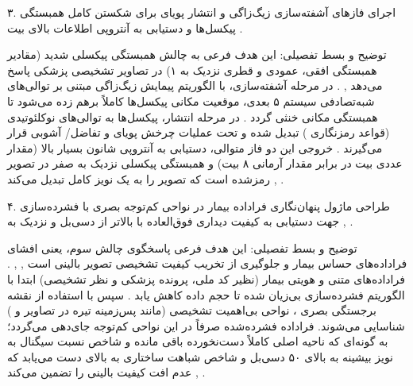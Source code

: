

۳. اجرای فازهای آشفته‌سازی زیگ‌زاگی  و انتشار پویای   برای شکستن کامل همبستگی پیکسل‌ها و دستیابی به آنتروپی اطلاعات بالای  بیت .\par

توضیح و بسط تفصیلی: این هدف فرعی به چالش همبستگی پیکسلی شدید (مقادیر همبستگی افقی، عمودی و قطری نزدیک به ۱) در تصاویر تشخیصی پزشکی پاسخ می‌دهد , . در مرحله آشفته‌سازی، با الگوریتم پیمایش زیگ‌زاگی مبتنی بر توالی‌های شبه‌تصادفی سیستم ۵ بعدی، موقعیت مکانی پیکسل‌ها کاملاً برهم زده می‌شود تا همبستگی مکانی خنثی گردد . در مرحله انتشار، پیکسل‌ها به توالی‌های نوکلئوتیدی  (قواعد رمزنگاری ) تبدیل شده و تحت عملیات چرخش پویای   و تفاضل/ آشوبی قرار می‌گیرند . خروجی این دو فاز متوالی، دستیابی به آنتروپی شانون بسیار بالا (مقدار عددی  بیت در برابر مقدار آرمانی ۸ بیت) و همبستگی پیکسلی نزدیک به صفر در تصویر رمزشده است که تصویر را به یک نویز کامل تبدیل می‌کند , .\par



۴. طراحی ماژول پنهان‌نگاری فراداده بیمار در نواحی کم‌توجه بصری  با فشرده‌سازی  جهت دستیابی به کیفیت دیداری فوق‌العاده با  بالاتر از  دسی‌بل و  نزدیک به  , .\par

توضیح و بسط تفصیلی: این هدف فرعی پاسخگوی چالش سوم، یعنی افشای فراداده‌های حساس بیمار و جلوگیری از تخریب کیفیت تشخیصی تصویر بالینی است , , . فراداده‌های متنی و هویتی بیمار (نظیر کد ملی، پرونده پزشکی و نظر تشخیصی) ابتدا با الگوریتم  فشرده‌سازی بی‌زیان شده تا حجم داده کاهش یابد . سپس با استفاده از نقشه برجستگی بصری ، نواحی بی‌اهمیت تشخیصی (مانند پس‌زمینه تیره در تصاویر  و ) شناسایی می‌شوند. فراداده فشرده‌شده صرفاً در این نواحی کم‌توجه جای‌دهی می‌گردد؛ به گونه‌ای که ناحیه اصلی  کاملاً دست‌نخورده باقی مانده و شاخص نسبت سیگنال به نویز بیشینه  به بالای ۵۰ دسی‌بل و شاخص شباهت ساختاری  به بالای  دست می‌یابد که عدم افت کیفیت بالینی را تضمین می‌کند , .\par

